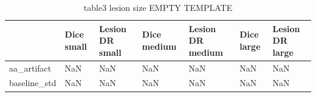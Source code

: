 \begin{table}
\caption{table3 lesion size EMPTY TEMPLATE}
\label{tab:table3_lesion_size_EMPTY_TEMPLATE}
\begin{tabular}{lllllll}
\toprule
 & Dice small & Lesion DR small & Dice medium & Lesion DR medium & Dice large & Lesion DR large \\
\midrule
aa\_artifact & NaN & NaN & NaN & NaN & NaN & NaN \\
baseline\_std & NaN & NaN & NaN & NaN & NaN & NaN \\
\bottomrule
\end{tabular}
\end{table}
